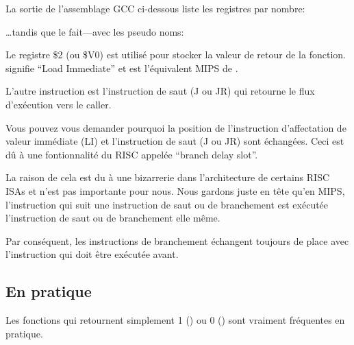 \label{MIPS_leaf_function_ex1}

La sortie de l'assemblage GCC ci-dessous liste les registres par nombre:



\dots tandis que \IDA le fait---avec les pseudo noms:



Le registre \$2 (ou \$V0) est utilisé pour stocker la valeur de retour de la fonction.
 signifie ``Load Immediate'' et est l'équivalent MIPS de \MOV.


L'autre instruction est l'instruction de saut (J ou JR) qui retourne le flux d'exécution vers le \gls{caller}.


Vous pouvez vous demander pourquoi la position de l'instruction d'affectation de valeur immédiate (LI) et l'instruction de saut (J ou JR) sont échangées. Ceci est dû à une fontionnalité du \ac{RISC} appelée ``branch delay slot''.

La raison de cela est du à une bizarrerie dans l'architecture de certains RISC \ac{ISA}s et n'est pas importante pour nous. Nous gardons juste en tête qu'en MIPS, l'instruction qui suit une instruction de saut ou de branchement est exécutée  l'instruction de saut ou de branchement elle même.

Par conséquent, les instructions de branchement échangent toujours de place avec l'instruction qui doit être exécutée avant.


\subsection{En pratique}

Les fonctions qui retournent simplement 1 () ou 0 () sont vraiment fréquentes en pratique.
